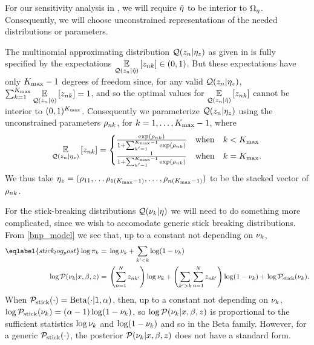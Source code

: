
For our sensitivity analysis in , we will require
$\hat\eta$ to be interior to $\Omega_{\eta}$.  Consequently, we will choose
unconstrained representations of the needed distributions or parameters.


\begin{ex}
%
The multinomial approximating distribution $\mathcal{Q}(z_n \vert \eta_{z})$ as given in
 is fully specified by the expectations $\underset{\mathcal{Q}(z_n \vert
\hat\eta)}{\mathbb{E}}\left[z_{nk}\right] \in (0, 1)$.  But these expectations have only ${K_{\mathrm{max}}} -1$
degrees of freedom since, for any valid $\mathcal{Q}(z_n \vert \eta_{z})$,
$\sum_{k=1}^{K_{\mathrm{max}}} \underset{\mathcal{Q}(z_n \vert \hat\eta)}{\mathbb{E}}\left[z_{nk}\right] = 1$, and so the
optimal values for $\underset{\mathcal{Q}(z_n \vert \hat\eta)}{\mathbb{E}}\left[z_{nk}\right]$ cannot be
interior to $(0,1)^{K_{\mathrm{max}}}$.  Consequently we parameterize
$\mathcal{Q}(z_n \vert \eta_{z})$ using the unconstrained parameters $\rho_{nk}$,
for $k=1,\ldots,{K_{\mathrm{max}}} - 1$, where
%
\begin{align*}
%
\expect{\q(\z_\n \vert \etaz)}{\z_{\n\k}} =
\begin{cases}
    \frac{\exp(\rho_{\n\k})}{1 + \sum_{\k'=1}^{\kmax - 1}\exp(\rho_{\n\k})}
    & \mathrm{ when }\quad\k < \kmax \\
    \frac{1}{1 + \sum_{\k'=1}^{\kmax - 1}\exp(\rho_{\n\k})}
    & \mathrm{ when }\quad\k = \kmax.
\end{cases}
%
\end{align*}
%
We thus take $\eta_{z} = (\rho_{11}, \ldots \rho_{1({K_{\mathrm{max}}} - 1)}, \ldots,
\rho_{n({K_{\mathrm{max}}} - 1)})$ to be the stacked vector of $\rho_{nk}$.
%
\end{ex}



For the stick-breaking distributions $\mathcal{Q}(\nu_{k} \vert \eta)$ we will need to do
something more complicated, since we wish to accomodate generic stick breaking
distributions.  From \eqref{bnp_model} we see that, up to a constant not
depending on $\nu_{k}$,
%
\begin{align}\eqlabel{stick_log_post}
%
\log \pi_\k ={}&
    \log \nuk + \sum_{\k' < \k} \log (1 - \nuk) \nonumber \\
\logp(\nu_{\k} \vert \x, \beta, \z) ={}&
    \left(\sum_{\n=1}^\N \z_{\n\k'}\right) \log \nuk +
    \left( \sum_{\k' > \k} \sum_{\n=1}^\N \z_{\n\k'} \right) \log (1 - \nuk) +
    \log \pstick(\nuk).
%
\end{align}
%
When $\mathcal{P}_{\mathrm{stick}}(\cdot) = \mathrm{Beta}(\cdot | 1, \alpha)$, then, up to a constant
not depending on $\nu_{k}$, $\log \mathcal{P}_{\mathrm{stick}}(\nu_{k}) = (\alpha - 1) \log (1 -
\nu_{k})$, so $\log \mathcal{P}(\nu_{k} \vert x, \beta, z)$ is proportional to the
sufficient statistics $\log \nu_{k}$ and $\log(1 - \nu_{k})$ and so in the
Beta family.  However, for a generic $\mathcal{P}_{\mathrm{stick}}(\cdot)$, the posterior
$\mathcal{P}(\nu_{k} \vert x, \beta, z)$ does not have a standard form.

